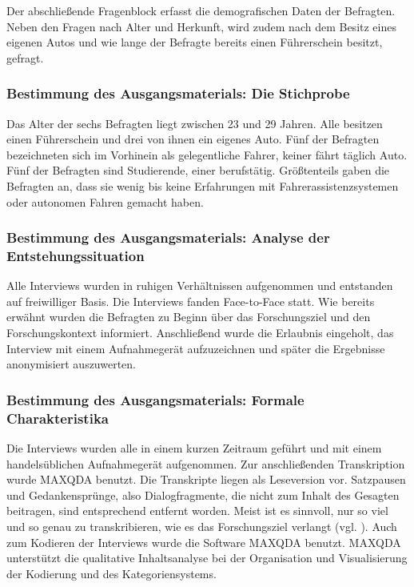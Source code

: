 \documentclass[12pt]{article}
\begin{document}
Der abschließende Fragenblock erfasst die demografischen Daten der Befragten. Neben den Fragen nach Alter und Herkunft, wird zudem nach dem Besitz eines eigenen Autos und wie lange der Befragte bereits einen Führerschein besitzt, gefragt.

\subsubsection*{Bestimmung des Ausgangsmaterials: Die Stichprobe}
Das Alter der sechs Befragten liegt zwischen 23 und 29 Jahren. Alle besitzen einen Führerschein und drei von ihnen ein eigenes Auto. Fünf der Befragten bezeichneten sich im Vorhinein als gelegentliche Fahrer, keiner fährt täglich Auto. Fünf der Befragten sind Studierende, einer berufstätig. Größtenteils gaben die Befragten an, dass sie wenig bis keine Erfahrungen mit Fahrerassistenzsystemen oder autonomen Fahren gemacht haben.

\subsubsection*{Bestimmung des Ausgangsmaterials: Analyse der Entstehungssituation}
Alle Interviews wurden in ruhigen Verhältnissen aufgenommen und entstanden auf freiwilliger Basis. Die Interviews fanden Face-to-Face statt. Wie bereits erwähnt wurden die Befragten zu Beginn über das Forschungsziel und den Forschungskontext informiert. Anschließend wurde die Erlaubnis eingeholt, das Interview mit einem Aufnahmegerät aufzuzeichnen und später die Ergebnisse anonymisiert auszuwerten.

\subsubsection*{Bestimmung des Ausgangsmaterials: Formale Charakteristika}
Die Interviews wurden alle in einem kurzen Zeitraum geführt und mit einem handelsüblichen Aufnahmegerät aufgenommen. Zur anschließenden Transkription wurde MAXQDA benutzt. Die Transkripte liegen als Leseversion vor. Satzpausen und Gedankensprünge, also Dialogfragmente, die nicht zum Inhalt des Gesagten beitragen, sind entsprechend entfernt worden. Meist ist es sinnvoll, nur so viel und so genau zu transkribieren, wie es das Forschungsziel verlangt (vgl. \cite[108]{flick1995qualitative}).
Auch zum Kodieren der Interviews wurde die Software MAXQDA benutzt. MAXQDA unterstützt die qualitative Inhaltsanalyse bei der Organisation und Visualisierung der Kodierung und des Kategoriensystems.
\end{document}
